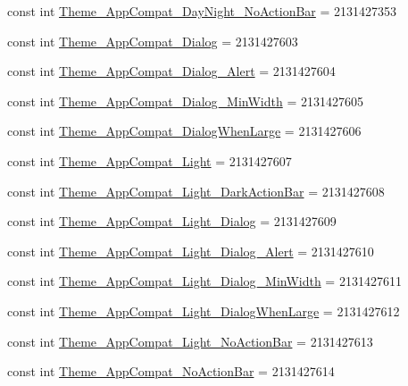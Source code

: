 \begin{CompactItemize}
\item 
const int \hyperlink{class__2doo_1_1_droid_1_1_resource_1_1_style_5c34f8723c872b23672e2fae2ec84a59}{Theme\_\-AppCompat\_\-DayNight\_\-NoActionBar} = 2131427353
\item 
const int \hyperlink{class__2doo_1_1_droid_1_1_resource_1_1_style_47a3411b65f71dab80e829510dec9024}{Theme\_\-AppCompat\_\-Dialog} = 2131427603
\item 
const int \hyperlink{class__2doo_1_1_droid_1_1_resource_1_1_style_0208f02cac0e781a3c7b48038268fa4c}{Theme\_\-AppCompat\_\-Dialog\_\-Alert} = 2131427604
\item 
const int \hyperlink{class__2doo_1_1_droid_1_1_resource_1_1_style_637d0f86338e1e99f7c6865ad4a6a4bf}{Theme\_\-AppCompat\_\-Dialog\_\-MinWidth} = 2131427605
\item 
const int \hyperlink{class__2doo_1_1_droid_1_1_resource_1_1_style_684a2fcc4283ec53a61634b542cb45dd}{Theme\_\-AppCompat\_\-DialogWhenLarge} = 2131427606
\item 
const int \hyperlink{class__2doo_1_1_droid_1_1_resource_1_1_style_0d9ae6518ab62a553c5be30aad1b4b63}{Theme\_\-AppCompat\_\-Light} = 2131427607
\item 
const int \hyperlink{class__2doo_1_1_droid_1_1_resource_1_1_style_3eb993d550b3b2db595e75eaaf9ca00e}{Theme\_\-AppCompat\_\-Light\_\-DarkActionBar} = 2131427608
\item 
const int \hyperlink{class__2doo_1_1_droid_1_1_resource_1_1_style_313d550572d9673aa00c690569592414}{Theme\_\-AppCompat\_\-Light\_\-Dialog} = 2131427609
\item 
const int \hyperlink{class__2doo_1_1_droid_1_1_resource_1_1_style_821aae0aaf748e705c7600eb4bd57977}{Theme\_\-AppCompat\_\-Light\_\-Dialog\_\-Alert} = 2131427610
\item 
const int \hyperlink{class__2doo_1_1_droid_1_1_resource_1_1_style_df8ca1f851b3a2902bfcf40259bf64a5}{Theme\_\-AppCompat\_\-Light\_\-Dialog\_\-MinWidth} = 2131427611
\item 
const int \hyperlink{class__2doo_1_1_droid_1_1_resource_1_1_style_bd1d3c4e425360e66a2f84b699e1516c}{Theme\_\-AppCompat\_\-Light\_\-DialogWhenLarge} = 2131427612
\item 
const int \hyperlink{class__2doo_1_1_droid_1_1_resource_1_1_style_3e1366fe3080381361828dd7a320cda8}{Theme\_\-AppCompat\_\-Light\_\-NoActionBar} = 2131427613
\item 
const int \hyperlink{class__2doo_1_1_droid_1_1_resource_1_1_style_74b80308893ae2bea46696569ba0cacf}{Theme\_\-AppCompat\_\-NoActionBar} = 2131427614

\end{CompactItemize}
